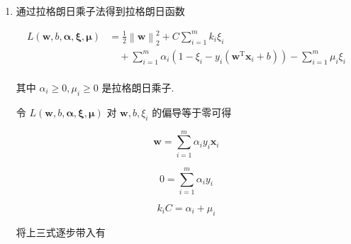 \documentclass[answers]{exam}  %
\begin{document}
\begin{questions}
\begin{solution}
\begin{enumerate}
      \item

            通过拉格朗日乘子法得到拉格朗日函数

            $$
              \begin{aligned}
                L(\bm{w}, b, \bm{\alpha}, \bm{\xi}, \bm{\mu}) & = \frac{1}{2} \left\| \bm{w} \right\|_{2}^{2} + C\sum_{i=1}^{m}k_i\xi_i                                \\
                                                              & \quad +\sum_{i=1}^{m}\alpha_i(1-\xi_i-y_i(\bm{w}^{\mathrm{T}}\bm{x}_i + b)) - \sum_{i=1}^{m}\mu_i\xi_i \\
              \end{aligned}
            $$

            其中 $\alpha_i \ge 0, \mu_i \ge 0$ 是拉格朗日乘子.

            令 $L(\bm{w}, b, \bm{\alpha}, \bm{\xi}, \bm{\mu})$ 对 $\bm{w}, b, \xi_i$ 的偏导等于零可得

            $$
              \bm{w} = \sum_{i=1}^{m}\alpha_i y_i \bm{x}_i
            $$

            $$
              0 = \sum_{i=1}^{m}\alpha_i y_i
            $$

            $$
              k_i C = \alpha_i + \mu_i
            $$

            将上三式逐步带入有


\end{enumerate}
\end{solution}
\end{questions}
\end{document}
